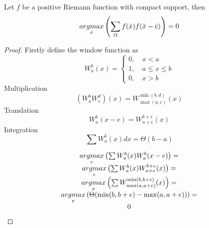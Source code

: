 \begin{theorem} %
    \label{thm:response_max}
    Let $f$ be a positive Riemann function with compact support, then
    \begin{equation}
      \underset{\bar{e}}{argmax}
      \left(
        \sum\limits_{\Omega}{f(\bar{x})f(\bar{x}-\bar{e})}
      \right)
      =0
    \end{equation}
\end{theorem}
\begin{proof}
  Firstly define the window function as
  \begin{equation}
    W_a^b(x)=
    \begin{cases}
      0,~& x<a\\
      1,~& a \leq x \leq b\\
      0,~& x>b
    \end{cases}
  \end{equation}
  Multiplication
  \begin{equation}
    (W_a^bW_c^d)(x)=W_{\max(a,c)}^{\min(b,d)}(x)
  \end{equation}
  Translation
  \begin{equation}
    W_a^b(x-e)=W_{a+e}^{b+e}(x)
  \end{equation}
  Integration
  \begin{equation}
    \label{eq:int_window}
    \sum{W_a^b(x)dx}=\Theta(b-a)
  \end{equation}
  
  \begin{equation}
    \begin{array}{c}
      
      \underset{e}{argmax}\left(
        \sum
        {
          W_a^b(x)W_a^b(x-e)
        }
      \right)
      =\\
      \underset{e}{argmax}\left(
        \sum
        {
          W_a^b(x)W_
          {
            a+e
          }
          ^
          {
            b+e
          }
          (x)
        }
      \right)
      =\\
      \underset{e}{argmax}\left(
        \sum
        {
          W_
          {
            \max(a,a+e)
          }^
          {
            \min(b,b+e)
          }
          (x)
        }
      \right)
      =\\
      \underset{e}{argmax}\left(
        \Theta(\min(b,b+e)-\max(a,a+e))
      \right)
      =\\
      0
    \end{array}
  \end{equation}
  

\end{proof}
